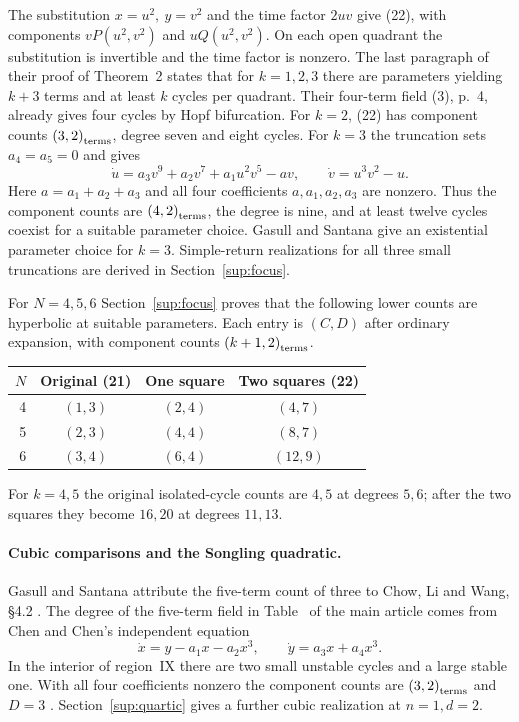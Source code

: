 The substitution \(x=u^2,\ y=v^2\) and the time factor \(2uv\) give (22), with components \(vP(u^2,v^2)\) and \(uQ(u^2,v^2)\). On each open quadrant the substitution is invertible and the time factor is nonzero. The last paragraph of their proof of Theorem~2 \cite[Theorem~2, Eq.~(22)]{GasullSantana2024} states that for \(k=1,2,3\) there are parameters yielding \(k+3\) terms and at least \(k\) cycles per quadrant. Their four-term field (3), p.~4, already gives four cycles by Hopf bifurcation. For \(k=2\), (22) has component counts \(\left(3,2\right)_{\mathrm{terms}}\), degree seven and eight cycles. For \(k=3\) the truncation sets \(a_4=a_5=0\) and gives
\[
 \dot u=a_3v^9+a_2v^7+a_1u^2v^5-av,\qquad \dot v=u^3v^2-u .
\]
Here \(a=a_1+a_2+a_3\) and all four coefficients \(a,a_1,a_2,a_3\) are nonzero. Thus the component counts are \(\left(4,2\right)_{\mathrm{terms}}\), the degree is nine, and at least twelve cycles coexist for a suitable parameter choice. Gasull and Santana give an existential parameter choice for \(k=3\). Simple-return realizations for all three small truncations are derived in Section~\ref{sup:focus}.

For \(N=4,5,6\) Section~\ref{sup:focus} proves that the following lower counts are hyperbolic at suitable parameters. Each entry is \((C,D)\) after ordinary expansion, with component counts \(\left(k+1,2\right)_{\mathrm{terms}}\).
\begin{center}\small
\begin{tabular}{rccc}\toprule
\(N\)&Original (21)&One square&Two squares (22)\\\midrule
4&\((1,3)\)&\((2,4)\)&\((4,7)\)\\
5&\((2,3)\)&\((4,4)\)&\((8,7)\)\\
6&\((3,4)\)&\((6,4)\)&\((12,9)\)\\\bottomrule
\end{tabular}
\end{center}
For \(k=4,5\) the original isolated-cycle counts are \(4,5\) at degrees \(5,6\); after the two squares they become \(16,20\) at degrees \(11,13\).

\paragraph{Cubic comparisons and the Songling quadratic.}
Gasull and Santana attribute the five-term count of three to Chow, Li and Wang, \S4.2 \cite{GasullSantana2024,ChowLiWang1994}. The degree of the five-term field in Table~ of the main article comes from Chen and Chen's independent equation
\[
 \dot x=y-a_1x-a_2x^3,\qquad \dot y=a_3x+a_4x^3 .
\]
In the interior of region~IX there are two small unstable cycles and a large stable one. With all four coefficients nonzero the component counts are \(\left(3,2\right)_{\mathrm{terms}}\) and \(D=3\) \cite[Table~2]{ChenChen2018}. Section~\ref{sup:quartic} gives a further cubic realization at \(n=1,d=2\).

